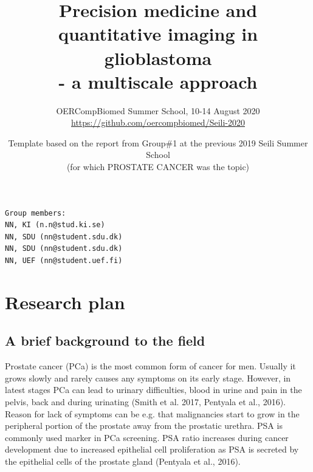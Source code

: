 \documentclass[11pt]{article}
\title{Precision medicine and quantitative imaging in glioblastoma \\ - a multiscale approach}
\author{OERCompBiomed Summer School, 10-14 August 2020\\
{\footnotesize \url{https://github.com/oercompbiomed/Seili-2020}}}
\date{Template based on the report from Group\#1 at the previous 2019 Seili Summer School\\
(for which PROSTATE CANCER was the topic)}
\begin{document}
\maketitle

\begin{scriptsize}
\begin{verbatim}
Group members:
NN, KI (n.n@stud.ki.se)
NN, SDU (nn@student.sdu.dk)
NN, SDU (nn@student.sdu.dk)
NN, UEF (nn@student.uef.fi)
\end{verbatim}
\end{scriptsize}
\vspace{8mm}
\section{Research plan} %

\vspace{3mm}

\subsection{A brief background to the field}
Prostate cancer (PCa) is the most common form of cancer for men. Usually it grows slowly and rarely causes any symptoms on its early stage. However, in latest stages PCa can lead to urinary difficulties, blood in urine and pain in the pelvis, back and during urinating (Smith et al. 2017, Pentyala et al., 2016). Reason for lack of symptoms can be e.g. that malignancies start to grow in the peripheral portion of the prostate away from the prostatic urethra. PSA is commonly used marker in PCa screening. PSA ratio increases during cancer development due to increased epithelial cell proliferation as PSA is secreted by the epithelial cells of the prostate gland (Pentyala et al., 2016). 
\end{document}
